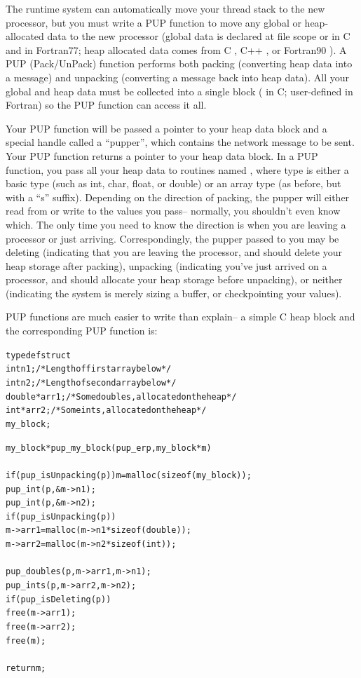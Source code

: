 \documentclass[10pt]{article}
\begin{document}
The runtime system can automatically move your thread stack to the new
processor, but you must write a PUP function to move any global or
heap-allocated data to the new processor (global data is declared at file scope
or  in C and  in Fortran77; heap allocated data comes
from C , C++ , or Fortran90 ).  A PUP
(Pack/UnPack) function performs both packing (converting heap data into a
message) and unpacking (converting a message back into heap data).  All your
global and heap data must be collected into a single block ( in C;
user-defined  in Fortran) so the PUP function can access it all.

Your PUP function will be passed a pointer to your heap data block and a
special handle called a ``pupper'', which contains the network message to be
sent.  Your PUP function returns a pointer to your heap data block.  In a PUP
function, you pass all your heap data to routines named , where
type is either a basic type (such as int, char, float, or double) or an array
type (as before, but with a ``s'' suffix).  Depending on the direction of
packing, the pupper will either read from or write to the values you pass--
normally, you shouldn't even know which.  The only time you need to know the
direction is when you are leaving a processor or just arriving.
Correspondingly, the pupper passed to you may be deleting (indicating that you
are leaving the processor, and should delete your heap storage after packing),
unpacking (indicating you've just arrived on a processor, and should allocate
your heap storage before unpacking), or neither (indicating the system is
merely sizing a buffer, or checkpointing your values).

PUP functions are much easier to write than explain-- a simple C heap block
and the corresponding PUP function is:

\begin{alltt}
     typedef struct {
       int n1;/*Length of first array below*/
       int n2;/*Length of second array below*/
       double *arr1; /*Some doubles, allocated on the heap*/
       int *arr2; /*Some ints, allocated on the heap*/
     } my_block;
 
     my_block *pup_my_block(pup_er p,my_block *m)
     {
       if (pup_isUnpacking(p)) m=malloc(sizeof(my_block));
       pup_int(p,\&m->n1);
       pup_int(p,\&m->n2);
       if (pup_isUnpacking(p)) {
         m->arr1=malloc(m->n1*sizeof(double));
         m->arr2=malloc(m->n2*sizeof(int));
       }
       pup_doubles(p,m->arr1,m->n1);
       pup_ints(p,m->arr2,m->n2);
       if (pup_isDeleting(p)) {
         free(m->arr1);
         free(m->arr2);
         free(m);
       }
       return m;
     }
\end{alltt}
\end{document}
